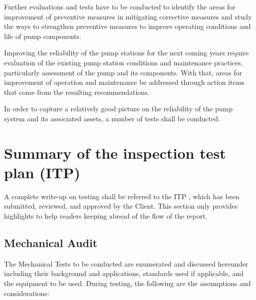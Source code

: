 

Further evaluations and tests have to be conducted to identify the areas for improvement of preventive measures in mitigating corrective measures and study the ways to strengthen preventive measures to improve operating conditions and life of pump components. 

Improving the reliability of the pump stations for the next coming years require evaluation of the existing pump station conditions and maintenance practices, particularly assessment of the pump and its components. With that, areas for improvement of operation and maintenance be addressed through action items that come from the resulting recommendations.

In order to capture a relatively good picture on the reliability of the pump system and its associated assets, a number of tests shall be conducted. 

\section{Summary of the inspection test plan (ITP)}
\label{231}
A complete write-up on testing shall be referred to the ITP \cite{GHD2018k,GHD2018o}, which has been submitted, reviewed, and approved by the Client. This section only provides highlights to help readers keeping abread of the flow of the report.

\subsection{Mechanical Audit}
\label{232}
The Mechanical Tests to be conducted are enumerated and discussed hereunder including their background and applications, standards used if applicable, and the equipment to be used. During testing, the following are the assumptions and considerations:

